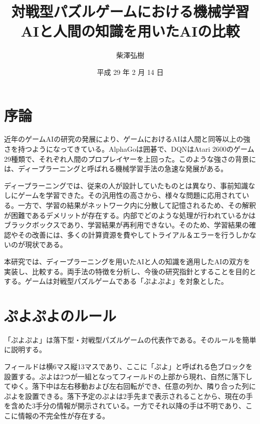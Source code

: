 \documentclass[twocolumn, a4paper]{UECIEresume}
\title{対戦型パズルゲームにおける機械学習AIと人間の知識を用いたAIの比較}
\date{平成 29 年 2 月 14 日}
\affiliation{総合情報学科 メディア情報学 コース}
\author{柴澤弘樹}
\begin{document}
\maketitle

\section{序論}
近年のゲームAIの研究の発展により、ゲームにおけるAIは人間と同等以上の強さを持つようになってきている。AlphaGo\cite{alphaGo}は囲碁で、DQN\cite{dqn}はAtari 2600のゲーム29種類で、それぞれ人間のプロプレイヤーを上回った。このような強さの背景には、ディープラーニングと呼ばれる機械学習手法の急速な発展がある。

ディープラーニングでは、従来の人が設計していたものとは異なり、事前知識なしにゲームを学習できた。その汎用性の高さから、様々な問題に応用されている。一方で、学習の結果がネットワーク内に分散して記憶されるため、その解釈が困難であるデメリットが存在する。内部でどのような処理が行われているかはブラックボックスであり、学習結果が再利用できない。そのため、学習結果の確認やその改善には、多くの計算資源を費やしてトライアル＆エラーを行うしかないのが現状である。


本研究では、ディープラーニングを用いたAIと人の知識を適用したAIの双方を実装し、比較する。両手法の特徴を分析し、今後の研究指針とすることを目的とする。ゲームは対戦型パズルゲームである「ぷよぷよ」を対象とした。


\section{ぷよぷよのルール}
「ぷよぷよ」は落下型・対戦型パズルゲームの代表作である。そのルールを簡単に説明する。

フィールドは横6マス縦13マスであり、ここに「ぷよ」と呼ばれる色ブロックを設置する。ぷよは2つが一組となってフィールドの上部から現れ、自然に落下してゆく。落下中は左右移動および左右回転ができ、任意の列か、隣り合った列にぷよを設置できる。落下予定のぷよは2手先まで表示されることから、現在の手を含めた3手分の情報が開示されている。一方でそれ以降の手は不明であり、ここに情報の不完全性が存在する。
\end{document}

